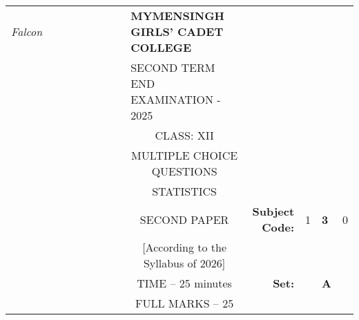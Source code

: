 \documentclass[12pt]{exam}
\begin{document}
\begin{table}[]
\begin{tabular}{llllllllcllll}
\textit{Falcon} &  &  &  &  &  &  &  & \multicolumn{1}{l}{\textbf{MYMENSINGH GIRLS' CADET COLLEGE}} &                                             &                        &                                 &                        \\
                &  &  &  &  &  &  &  & \multicolumn{1}{l}{SECOND TERM END EXAMINATION - 2025}       &                                             &                        & \multicolumn{1}{c}{}            &                        \\
                &  &  &  &  &  &  &  & CLASS: XII                                                   &                                             &                        & \multicolumn{1}{c}{}            &                        \\
                &  &  &  &  &  &  &  & MULTIPLE CHOICE QUESTIONS                                    &                                             &                        & \multicolumn{1}{c}{}            &                        \\
                &  &  &  &  &  &  &  & STATISTICS                                                   &                                             &                        & \multicolumn{1}{r}{}            &                        \\ \cline{11-13} 
                &  &  &  &  &  &  &  & SECOND PAPER                                                 & \multicolumn{1}{r|}{\textbf{Subject Code:}} & \multicolumn{1}{l|}{1} & \multicolumn{1}{l|}{\textbf{3}} & \multicolumn{1}{l|}{0} \\ \cline{11-13} 
                &  &  &  &  &  &  &  & [According to the Syllabus of 2026]                          & \multicolumn{1}{r}{}                        &                        &                                 &                        \\ \cline{12-12}
                &  &  &  &  &  &  &  & TIME – 25 minutes                                            & \multicolumn{1}{r}{\textbf{Set:}}           & \multicolumn{1}{l|}{}  & \multicolumn{1}{l|}{\textbf{A}} &                        \\ \cline{12-12}
                &  &  &  &  &  &  &  & FULL MARKS – 25                                              &                                             &                        &                                 &                       
\end{tabular}
\end{table}
\end{document}
